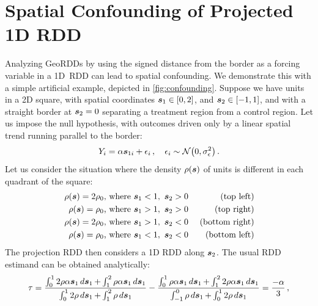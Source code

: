 \section{Spatial Confounding of Projected 1D RDD}
\label{sec:confounding}

    Analyzing GeoRDDs by using the signed distance from the border as a forcing variable in a 1D~RDD can lead to spatial confounding.
We demonstrate this with a simple artificial example, depicted in \autoref{fig:confounding}.
Suppose we have units in a 2D square, with spatial coordinates \(\bm{s}_1 \in [0,2]\), and \(\bm{s}_2 \in [-1,1]\), and with a straight border at \(\bm{s}_2=0\) separating a treatment region from a control region.
Let us impose the null hypothesis, with outcomes driven only by a linear spatial trend running parallel to the border:
\begin{equation}
    Y_{i} = \alpha \svec_{1i} + \epsilon_i \,,\quad\epsilon_i \sim \normal\del{0, \sigman^2}
    \,.
\end{equation}
Let us consider the situation where the density \(\rho(\bm{s})\) of units is different in each quadrant of the square:
\begin{equation}
    \begin{aligned}
        \rho(\bm{s}) = 2\rho_0 & \text{, where }\bm{s}_1 < 1,~\bm{s}_2 > 0 & \text{ (top left)} \\
        \rho(\bm{s}) = \rho_0 & \text{, where }\bm{s}_1 > 1,~\bm{s}_2 > 0 & \text{ (top right)} \\
        \rho(\bm{s}) = 2\rho_0 & \text{, where }\bm{s}_1 > 1,~\bm{s}_2 < 0 & \text{ (bottom right)}  \\
        \rho(\bm{s}) = \rho_0 & \text{, where }\bm{s}_1 < 1,~\bm{s}_2 < 0 & \text{ (bottom left)}
    \end{aligned}
\end{equation}
The projection RDD then considers a 1D RDD along \(\bm{s}_2\).
The usual RDD estimand  can be obtained analytically:
\begin{equation}
    \tau = \frac{
            \int_{0}^{1}  2\rho \alpha \bm{s}_{1} \mathop{d \bm{s}}_{1}
            + \int_{1}^{2}  \rho \alpha \bm{s}_{1} \mathop{d \bm{s}}_{1}
        }{
            \int_{0}^{1}  2\rho \mathop{d \bm{s}}_{1}
            + \int_{1}^{2}  \rho \mathop{d \bm{s}}_{1}
        }
        -
        \frac{
            \int_{0}^{1} \rho \alpha \bm{s}_{1} \mathop{d \bm{s}}_{1}
            + \int_{1}^{2} 2\rho \alpha \bm{s}_{1} \mathop{d \bm{s}}_{1}
        }{
            \int_{-1}^{0} \rho \mathop{d \bm{s}}_{1}
            + \int_{0}^{1} 2\rho \mathop{d \bm{s}}_{1}
        }
    = \frac{-\alpha}{3}
    \,,
\end{equation}
